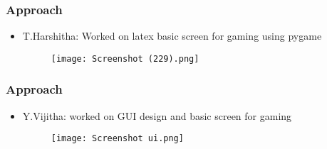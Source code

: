 \documentclass[12pt]{beamer}
\begin{document}
    \begin{frame}
	\frametitle{Approach}
	\begin{itemize}
	    \item T.Harshitha: Worked on latex basic screen for gaming using pygame\\
\begin{figure}
\texttt{[image: Screenshot (229).png]}
\end{figure}
	    
	    \end{itemize}
	    \end{frame}
	    \begin{frame}
	\frametitle{Approach}
	\begin{itemize}
	    \item Y.Vijitha: worked on GUI design and basic screen for gaming\\
	    \begin{figure}
\texttt{[image: Screenshot ui.png]}
\end{figure}
	    \end{itemize}
	    \end{frame}
	    
\end{document}
